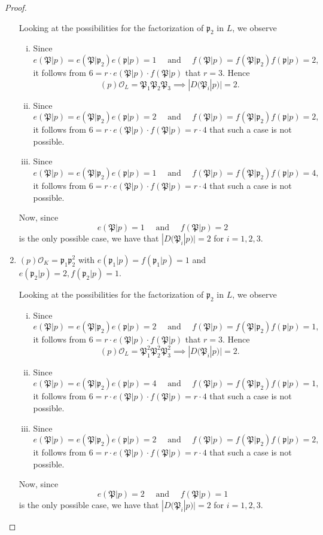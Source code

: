 \begin{proof}
\begin{enumerate}[1.]
Looking at the possibilities for the factorization of $\mathfrak{p}_2$ in $L$, we observe
\begin{enumerate}[i.]
\item Since 
\[e(\mathfrak{P}|p) = e(\mathfrak{P}|\mathfrak{p}_2)e(\mathfrak{p}|p) = 1 \quad \text{ and } \quad f(\mathfrak{P}|p) = f(\mathfrak{P}|\mathfrak{p}_2)f(\mathfrak{p}|p) = 2,\]
it follows from $6 = r\cdot e(\mathfrak{P}|p)\cdot f(\mathfrak{P}|p)$ that $r = 3$. Hence
\[(p)\mathcal{O}_L = \mathfrak{P}_1\mathfrak{P}_2\mathfrak{P}_3 \implies |D(\mathfrak{P}_i|p)| = 2.\]
\item Since 
\[e(\mathfrak{P}|p) = e(\mathfrak{P}|\mathfrak{p}_2)e(\mathfrak{p}|p) = 2 \quad \text{ and } \quad f(\mathfrak{P}|p) = f(\mathfrak{P}|\mathfrak{p}_2)f(\mathfrak{p}|p) = 2,\]
it follows from $6 = r\cdot e(\mathfrak{P}|p)\cdot f(\mathfrak{P}|p) = r \cdot 4$ that such a case is not possible.
\item Since 
\[e(\mathfrak{P}|p) = e(\mathfrak{P}|\mathfrak{p}_2)e(\mathfrak{p}|p) = 1 \quad \text{ and } \quad f(\mathfrak{P}|p) = f(\mathfrak{P}|\mathfrak{p}_2)f(\mathfrak{p}|p) = 4,\]
it follows from $6 = r\cdot e(\mathfrak{P}|p)\cdot f(\mathfrak{P}|p) = r \cdot 4$ that such a case is not possible.\end{enumerate}
Now, since
\[e(\mathfrak{P}|p) = 1 \quad \text{ and } \quad f(\mathfrak{P}|p) = 2\]
is the only possible case, we have that $|D(\mathfrak{P}_i|p)| = 2$ for $i = 1,2,3$.

\item $(p)\mathcal{O}_K = \mathfrak{p}_1 \mathfrak{p}_2^2$ with $e(\mathfrak{p}_1|p) = f(\mathfrak{p}_1|p) = 1$ and $e(\mathfrak{p}_2|p) = 2, f(\mathfrak{p}_2|p) = 1$.

Looking at the possibilities for the factorization of $\mathfrak{p}_2$ in $L$, we observe
\begin{enumerate}[i.]
\item Since 
\[e(\mathfrak{P}|p) = e(\mathfrak{P}|\mathfrak{p}_2)e(\mathfrak{p}|p) = 2 \quad \text{ and } \quad f(\mathfrak{P}|p) = f(\mathfrak{P}|\mathfrak{p}_2)f(\mathfrak{p}|p) = 1,\]
it follows from $6 = r\cdot e(\mathfrak{P}|p)\cdot f(\mathfrak{P}|p)$ that $r = 3$. Hence
\[(p)\mathcal{O}_L = \mathfrak{P}_1^2\mathfrak{P}_2^2\mathfrak{P}_3^2 \implies |D(\mathfrak{P}_i|p)| = 2.\]
\item Since 
\[e(\mathfrak{P}|p) = e(\mathfrak{P}|\mathfrak{p}_2)e(\mathfrak{p}|p) = 4 \quad \text{ and } \quad f(\mathfrak{P}|p) = f(\mathfrak{P}|\mathfrak{p}_2)f(\mathfrak{p}|p) = 1,\]
it follows from $6 = r\cdot e(\mathfrak{P}|p)\cdot f(\mathfrak{P}|p) = r \cdot 4$ that such a case is not possible.
\item Since 
\[e(\mathfrak{P}|p) = e(\mathfrak{P}|\mathfrak{p}_2)e(\mathfrak{p}|p) = 2 \quad \text{ and } \quad f(\mathfrak{P}|p) = f(\mathfrak{P}|\mathfrak{p}_2)f(\mathfrak{p}|p) = 2,\]
it follows from $6 = r\cdot e(\mathfrak{P}|p)\cdot f(\mathfrak{P}|p) = r \cdot 4$ that such a case is not possible.\end{enumerate}
Now, since
\[e(\mathfrak{P}|p) = 2 \quad \text{ and } \quad f(\mathfrak{P}|p) = 1\]
is the only possible case, we have that $|D(\mathfrak{P}_i|p)| = 2$ for $i = 1,2,3$.


\end{enumerate}
\end{proof}
